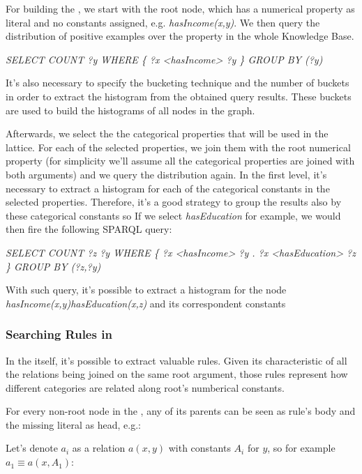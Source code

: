 For building the \graphname, we start with the root node, which has a numerical property as literal and no constants assigned, e.g. \emph{hasIncome(x,y)}. We then query the  distribution of positive examples over the property in the whole Knowledge Base.

\begin{center}
 \emph{SELECT COUNT ?y WHERE \{ ?x <hasIncome> ?y \} GROUP BY (?y)}
\end{center}

It's also necessary to specify the bucketing technique and the number of buckets in order to extract the histogram from the obtained query results. These buckets are used to build the histograms of all nodes in the graph.

Afterwards, we select the the categorical properties that will be used in the lattice. For each of the selected properties, we join them with the root numerical property (for simplicity we'll assume all the categorical properties are joined with both  arguments) and we query the distribution again. In the first level, it's necessary to extract a histogram for each of the categorical constants in the selected properties. Therefore, it's a good strategy to group the results also by these categorical constants so If we select \emph{hasEducation} for example, we would then fire the following SPARQL query:

\begin{center}
 \emph{SELECT COUNT ?z ?y WHERE \{ ?x <hasIncome> ?y . ?x <hasEducation> ?z \} GROUP BY (?z,?y)}
\end{center}

With such query, it's possible to extract a histogram for the node \emph{hasIncome(x,y)hasEducation(x,z)} and its correspondent constants 

\subsubsection{Searching Rules in \graphname}

In the \graphname itself, it's possible to extract valuable rules. Given its characteristic of all the relations being joined on the same root argument, those rules represent how different categories are related along root's numberical constants.

For every non-root node in the \graphname, any of its parents can be seen as rule's body and the missing literal as head, e.g.:

Let's denote $a_i$ as a relation $a(x,y)$ with constants $A_i$ for $y$, so for example $a_1 \equiv a(x,A_1)$:

